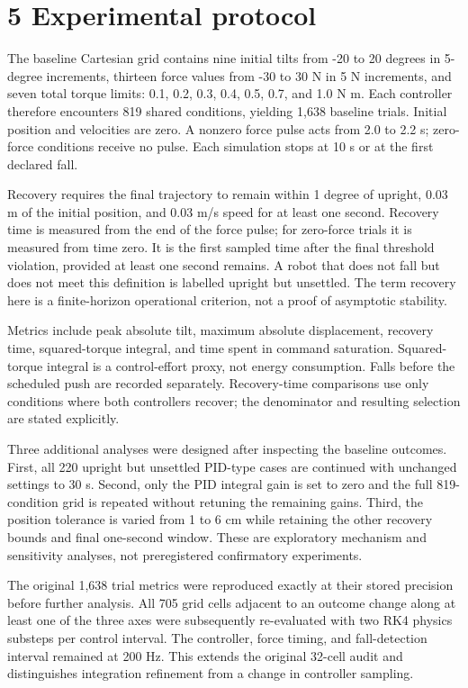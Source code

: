 \documentclass[11pt,a4paper]{article}
\begin{document}
\section*{5 Experimental protocol}
The baseline Cartesian grid contains nine initial tilts from -20 to 20 degrees in 5-degree increments, thirteen force values from -30 to 30 N in 5 N increments, and seven total torque limits: 0.1, 0.2, 0.3, 0.4, 0.5, 0.7, and 1.0 N m. Each controller therefore encounters 819 shared conditions, yielding 1,638 baseline trials. Initial position and velocities are zero. A nonzero force pulse acts from 2.0 to 2.2 s; zero-force conditions receive no pulse. Each simulation stops at 10 s or at the first declared fall.

Recovery requires the final trajectory to remain within 1 degree of upright, 0.03 m of the initial position, and 0.03 m/s speed for at least one second. Recovery time is measured from the end of the force pulse; for zero-force trials it is measured from time zero. It is the first sampled time after the final threshold violation, provided at least one second remains. A robot that does not fall but does not meet this definition is labelled upright but unsettled. The term recovery here is a finite-horizon operational criterion, not a proof of asymptotic stability.

Metrics include peak absolute tilt, maximum absolute displacement, recovery time, squared-torque integral, and time spent in command saturation. Squared-torque integral is a control-effort proxy, not energy consumption. Falls before the scheduled push are recorded separately. Recovery-time comparisons use only conditions where both controllers recover; the denominator and resulting selection are stated explicitly.

Three additional analyses were designed after inspecting the baseline outcomes. First, all 220 upright but unsettled PID-type cases are continued with unchanged settings to 30 s. Second, only the PID integral gain is set to zero and the full 819-condition grid is repeated without retuning the remaining gains. Third, the position tolerance is varied from 1 to 6 cm while retaining the other recovery bounds and final one-second window. These are exploratory mechanism and sensitivity analyses, not preregistered confirmatory experiments.

The original 1,638 trial metrics were reproduced exactly at their stored precision before further analysis. All 705 grid cells adjacent to an outcome change along at least one of the three axes were subsequently re-evaluated with two RK4 physics substeps per control interval. The controller, force timing, and fall-detection interval remained at 200 Hz. This extends the original 32-cell audit and distinguishes integration refinement from a change in controller sampling.
\end{document}
